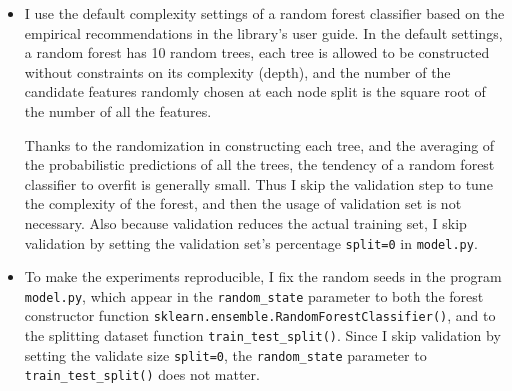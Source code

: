 \documentclass[preprint, 12pt]{elsarticle}
\begin{document}
\begin{itemize}
  
\item I use the default complexity settings of a random forest classifier based on the empirical recommendations in the library's user guide.
In the default settings,
a random forest has 10 random trees, 
each tree is allowed to be constructed without constraints on its complexity (depth), and
the number of the candidate features randomly chosen at each node split is the square root of the number of all the features.

Thanks to the randomization in constructing each tree, and the averaging of the probabilistic predictions of all the trees, 
the tendency of a random forest classifier to overfit is generally small. %
Thus I skip the validation step to tune the complexity of the forest, and then the usage of validation set is not necessary.
Also because validation reduces the actual training set, I skip validation by setting the validation set's percentage \verb|split=0| in \verb|model.py|.

\item To make the experiments reproducible, I fix the random seeds in the program \verb|model.py|, which appear in
the \verb|random_state| parameter to both the forest constructor function \verb|sklearn.ensemble.RandomForestClassifier()|, and to the splitting dataset function \verb|train_test_split()|.
Since I skip validation by setting the validate size \verb|split=0|,  the \verb|random_state| parameter to  \verb|train_test_split()| does not matter.

\end{itemize}






\end{document}
